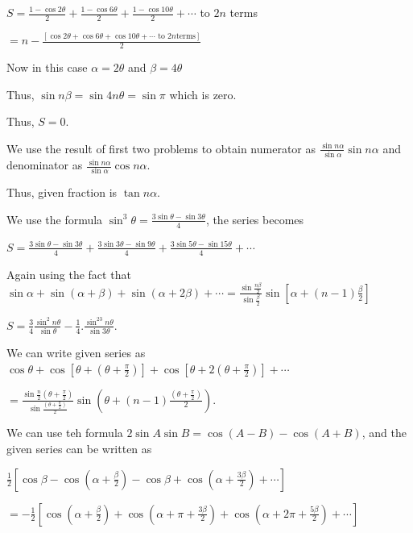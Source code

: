   $S = \frac{1 - \cos2\theta}{2} + \frac{1 - \cos6\theta}{2} + \frac{1 - \cos10\theta}{2} + \cdots$ to $2n$
  terms

  $= n - \frac{\left[\cos2\theta + \cos6\theta + \cos10\theta + \cdots \text{ to } 2n \text{
        terms}\right]}{2}$

  Now in this case $\alpha = 2\theta$ and $\beta = 4\theta$

  Thus, $\sin
  n\beta = \sin 4n\theta = \sin\pi$ which is zero.

  Thus, $S = 0$.
\item We use the result of first two problems to obtain numerator as $\frac{\sin n\alpha}{\sin\alpha}\sin
  n\alpha$ and denominator as $\frac{\sin n\alpha}{\sin\alpha}\cos n\alpha$.

  Thus, given fraction is $\tan n\alpha$.
\item We use the formula $\sin^3\theta = \frac{3\sin\theta - \sin3\theta}{4}$, the series becomes

  $S = \frac{3\sin\theta - \sin3\theta}{4} + \frac{3\sin3\theta - \sin9\theta}{4} + \frac{3\sin5\theta -
  \sin15\theta}{4} + \cdots$

  Again using the fact that $\sin\alpha + \sin(\alpha + \beta) + \sin(\alpha + 2\beta) + \cdots =
  \frac{\sin\frac{n\beta}{2}}{\sin\frac{\beta}{2}}\sin\left[\alpha + (n - 1)\frac{\beta}{2}\right]$

  $S = \frac{3}{4}\frac{\sin^2n\theta}{\sin\theta} - \frac{1}{4}.\frac{\sin^23n\theta}{\sin3\theta}$.
\item We can write given series as $\cos\theta + \cos\left[\theta + \left(\theta +
  \frac{\pi}{2}\right)\right] + \cos\left[\theta + 2\left(\theta + \frac{\pi}{2}\right)\right] + \cdots$

  $= \frac{\sin \frac{n}{2}\left(\theta + \frac{\pi}{2}\right)}{\sin\frac{\left(\theta +
    \frac{\pi}{2}\right)}{2}}\sin\left(\theta + (n - 1)\frac{\left(\theta + \frac{\pi}{2}\right)}{2}\right)$.
\item We can use teh formula $2\sin A\sin B = \cos(A - B) - \cos(A + B)$, and the given series can be
  written as

  $\frac{1}{2}\left[\cos\beta - \cos\left(\alpha + \frac{\beta}{2}\right) - \cos\beta + \cos\left(\alpha +
  \frac{3\beta}{2}\right) + \cdots\right]$

  $= -\frac{1}{2}\left[\cos\left(\alpha + \frac{\beta}{2}\right) + \cos\left(\alpha + \pi + \frac{3\beta}{2}\right)
    + \cos\left(\alpha + 2\pi + \frac{5\beta}{2}\right) + \cdots\right]$

